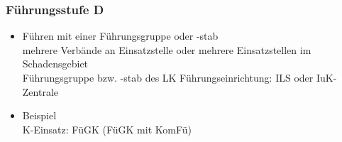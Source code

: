 \begin{normbox}{\subsubsection{Führungsstufe D}}
    \begin{itemize}
        \item Führen mit einer Führungsgruppe oder -stab\\
        \ra mehrere Verbände an Einsatzstelle oder mehrere Einsatzstellen im Schadensgebiet\\
        \ra Führungsgruppe bzw. -stab des LK
        \ra Führungseinrichtung: ILS oder IuK-Zentrale
        \item Beispiel\\
        \ra K-Einsatz: FüGK (FüGK mit KomFü)
    \end{itemize}
\end{normbox}